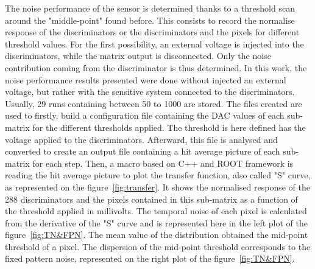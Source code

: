   The noise performance of the sensor is determined thanks to a threshold scan around the "middle-point" found before.
  This consists to record the normalise response of the discriminators or the discriminators and the pixels for different threshold values.
  For the first possibility, an external voltage is injected into the discriminators, while the matrix output is disconnected.
  Only the noise contribution coming from the discriminator is thus determined.
  In this work, the noise performance results presented were done without injected an external voltage, but rather with the sensitive system connected to the discriminators.
  Usually, 29 runs containing between 50 to 1000 are stored.
  The files created are used to firstly, build a configuration file containing the DAC values of each sub-matrix for the different thresholds applied.
  The threshold is here defined has the voltage applied to the discriminators.
  Afterward, this file is analysed and converted to create an output file containing a hit average picture of each sub-matrix for each step.
  Then, a macro based on C++ and ROOT framework is reading the hit average picture to plot the transfer function, also called "S" curve, as represented on the figure~\ref{fig:transfer}.
  It shows the normalised response of the 288 discriminators and the pixels contained in this sub-matrix as a function of the threshold applied in millivolts.
  The temporal noise of each pixel is calculated from the derivative of the "S" curve and is represented here in the left plot of the figure~\ref{fig:TN&FPN}.
  The mean value of the distribution obtained the mid-point threshold of a pixel.
  The dispersion of the mid-point threshold corresponds to the fixed pattern noise, represented on the right plot of the figure~\ref{fig:TN&FPN}.
  


